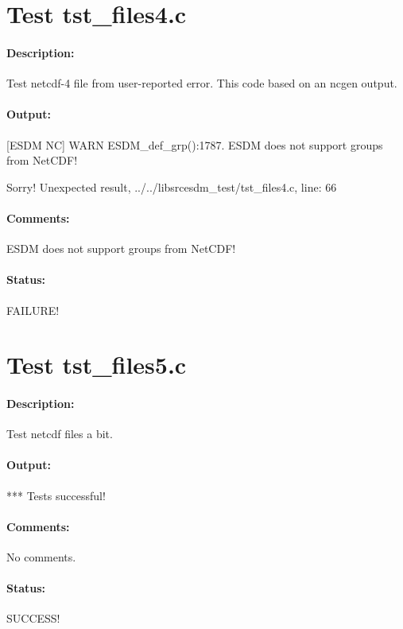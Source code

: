 \section{Test tst\_files4.c}

\paragraph{Description:} Test netcdf-4 file from user-reported error. This code based on an ncgen output.

\paragraph{Output:} [ESDM NC] WARN ESDM\_def\_grp():1787. ESDM does not support groups from NetCDF!

Sorry! Unexpected result, ../../libsrcesdm\_test/tst\_files4.c, line: 66

\paragraph{Comments:} ESDM does not support groups from NetCDF!

\paragraph{Status:} FAILURE!

\section{Test tst\_files5.c}

\paragraph{Description:} Test netcdf files a bit.

\paragraph{Output:} *** Tests successful!

\paragraph{Comments:} No comments.

\paragraph{Status:} SUCCESS!

